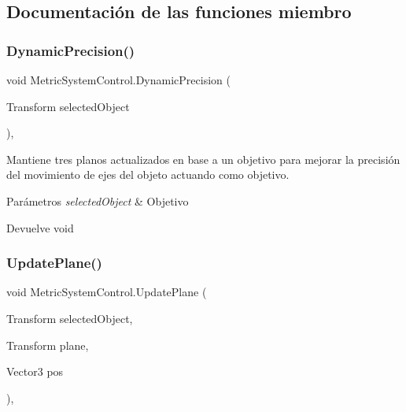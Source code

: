\subsection{Documentación de las funciones miembro}
\mbox{\label{class_metric_system_control_a853f57f47211b8c3a1f48c53ba552a0e}} 
\subsubsection{\texorpdfstring{DynamicPrecision()}{DynamicPrecision()}}
{\footnotesize\ttfamily void Metric\+System\+Control.\+Dynamic\+Precision (\begin{DoxyParamCaption}\item[{Transform}]{selected\+Object }\end{DoxyParamCaption})\hspace{0.3cm}{\ttfamily [inline]}, {\ttfamily [private]}}

Mantiene tres planos actualizados en base a un objetivo para mejorar la precisión del movimiento de ejes del objeto actuando como objetivo. 
\begin{DoxyParams}{Parámetros}
{\em selected\+Object} & Objetivo \\
\hline
\end{DoxyParams}
\begin{DoxyReturn}{Devuelve}
void 
\end{DoxyReturn}
\mbox{\label{class_metric_system_control_a233ff34bc7bf5ae589ffe0146430f2e0}} 
\subsubsection{\texorpdfstring{UpdatePlane()}{UpdatePlane()}}
{\footnotesize\ttfamily void Metric\+System\+Control.\+Update\+Plane (\begin{DoxyParamCaption}\item[{Transform}]{selected\+Object,  }\item[{Transform}]{plane,  }\item[{Vector3}]{pos }\end{DoxyParamCaption})\hspace{0.3cm}{\ttfamily [inline]}, {\ttfamily [private]}}


